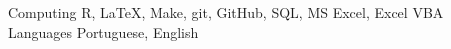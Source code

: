 \begin{cvskills}
  \cvskill
    {Computing}
    {R, LaTeX, Make, git, GitHub, SQL, MS Excel, Excel VBA}
  \cvskill
    {Languages}
    {Portuguese, English}
\end{cvskills}
